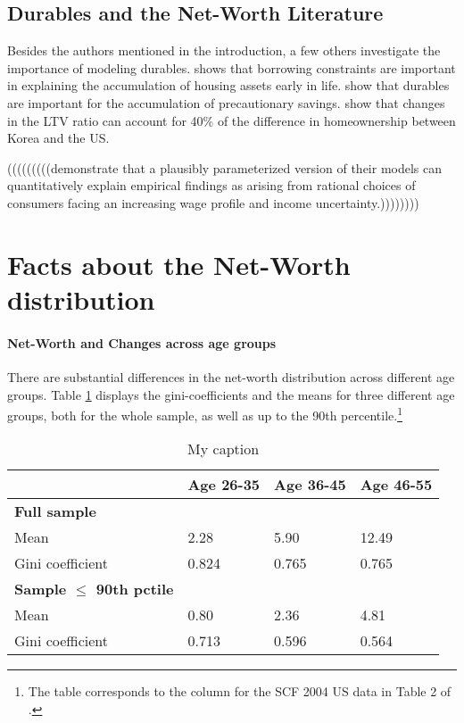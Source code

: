 \documentclass[a4paper,12pt]{article}
\begin{document}
\subsection{Durables and the Net-Worth Literature}
Besides the authors mentioned in the introduction, a few others investigate the importance of modeling durables. \cite{yang2009} shows that borrowing constraints are important in explaining the accumulation of housing assets early in life. \cite{gruber2003precautionary} show that durables are important for the accumulation of precautionary savings. \cite{cho2012accounting} show that changes in the LTV ratio can account for 40\% of the difference in homeownership between Korea and the US. 



(((((((((demonstrate that a plausibly parameterized version of their models can quantitatively explain empirical findings as arising from rational choices of consumers facing an increasing wage profile and income uncertainty.))))))))


\section{Facts about the Net-Worth distribution }
\paragraph{Net-Worth and Changes across age groups}
There are substantial differences in the net-worth distribution across different age groups. Table \ref{facts_changes} displays the gini-coefficients and the means for three different age groups, both for the whole sample, as well as up to the 90th percentile.\footnote{The table corresponds to the column for the SCF 2004 US data in Table 2 of \cite{hintermaier2011}. } \\

\begin{table}[!htbp]
\centering
\caption{My caption}
\label{facts_changes}
\begin{tabular}{@{}llll@{}}
\toprule
                     & Age 26-35 & Age 36-45 & Age 46-55 \\ \midrule
\textbf{Full sample}          &           &           &           \\
Mean                 & 2.28      & 5.90      & 12.49     \\
Gini coefficient     & 0.824     & 0.765     & 0.765     \\
\textbf{Sample $\leq$ 90th pctile} &           &           &           \\
Mean                 & 0.80      & 2.36      & 4.81      \\
Gini coefficient     & 0.713     & 0.596     & 0.564     \\ \bottomrule
\end{tabular}
\end{table}
\end{document}
